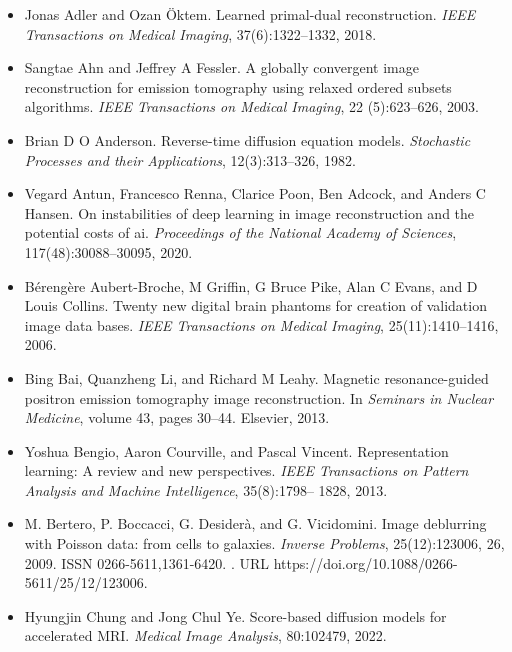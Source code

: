 \documentclass{article}
\begin{document}
\begin{itemize}
\item 
Jonas Adler and Ozan Öktem. Learned primal-dual reconstruction. \textit{IEEE Transactions on Medical Imaging}, 37(6):1322–1332, 2018.

\item 
Sangtae Ahn and Jeffrey A Fessler. A globally convergent image reconstruction for emission tomography using relaxed ordered subsets algorithms. \textit{IEEE Transactions on Medical Imaging}, 22 (5):623–626, 2003.

\item 
Brian D O Anderson. Reverse-time diffusion equation models. \textit{Stochastic Processes and their Applications}, 12(3):313–326, 1982.

\item 
Vegard Antun, Francesco Renna, Clarice Poon, Ben Adcock, and Anders C Hansen. On instabilities of deep learning in image reconstruction and the potential costs of ai. \textit{Proceedings of the National Academy of Sciences}, 117(48):30088–30095, 2020.

\item 
Bérengère Aubert-Broche, M Griffin, G Bruce Pike, Alan C Evans, and D Louis Collins. Twenty new digital brain phantoms for creation of validation image data bases. \textit{IEEE Transactions on Medical Imaging}, 25(11):1410–1416, 2006.

\item 
Bing Bai, Quanzheng Li, and Richard M Leahy. Magnetic resonance-guided positron emission tomography image reconstruction. In \textit{Seminars in Nuclear Medicine}, volume 43, pages 30–44. Elsevier, 2013.

\item 
Yoshua Bengio, Aaron Courville, and Pascal Vincent. Representation learning: A review and new perspectives. \textit{IEEE Transactions on Pattern Analysis and Machine Intelligence}, 35(8):1798– 1828, 2013.

\item 
M. Bertero, P. Boccacci, G. Desiderà, and G. Vicidomini. Image deblurring with Poisson data: from cells to galaxies. \textit{Inverse Problems}, 25(12):123006, 26, 2009. ISSN 0266-5611,1361-6420. . URL https://doi.org/10.1088/0266-5611/25/12/123006.

\item 
Hyungjin Chung and Jong Chul Ye. Score-based diffusion models for accelerated MRI. \textit{Medical Image Analysis}, 80:102479, 2022.


\end{itemize}
\end{document}
